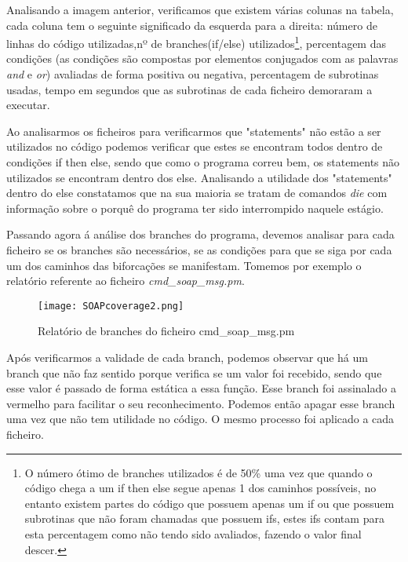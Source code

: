 \par Analisando a imagem anterior, verificamos que existem várias colunas na tabela, cada coluna tem o seguinte significado da esquerda para a direita: número de linhas do código utilizadas,nº de branches(if/else) utilizados\footnote{O número ótimo de branches utilizados é de 50\% uma vez que quando o código chega a um if then else segue apenas 1 dos caminhos possíveis, no entanto existem partes do código que possuem apenas um if ou que possuem subrotinas que não foram chamadas que possuem ifs, estes ifs contam para esta percentagem como não tendo sido avaliados, fazendo o valor final descer.}, percentagem das condições (as condições são compostas por elementos conjugados com as palavras \textit{and} e \textit{or}) avaliadas de forma positiva ou negativa, percentagem de subrotinas usadas, tempo em segundos que as subrotinas de cada ficheiro demoraram a executar.
\par Ao analisarmos os ficheiros para verificarmos que "statements" não estão a ser utilizados no código podemos verificar que estes se encontram todos dentro de condições if then else, sendo que como o programa correu bem, os statements não utilizados se encontram dentro dos else. Analisando a utilidade dos "statements" dentro do else constatamos que na sua maioria se tratam de comandos \textit{die} com informação sobre o porquê do programa ter sido interrompido naquele estágio.


\par Passando agora á análise dos branches do programa, devemos analisar para cada ficheiro se os branches são necessários, se as condições para que se siga por cada um dos caminhos das biforcações se manifestam. Tomemos por exemplo o relatório referente ao ficheiro \textit{cmd\_soap\_msg.pm}.

\begin{figure}[H]

  \centering
  \captionsetup{justification=centering}

  \texttt{[image: SOAPcoverage2.png]}
  
  \caption {Relatório de branches do ficheiro cmd\_soap\_msg.pm}

\end{figure}

\par Após verificarmos a validade de cada branch, podemos observar que há um branch que não faz sentido porque verifica se um valor foi recebido, sendo que esse valor é passado de forma estática a essa função. Esse branch foi assinalado a vermelho para facilitar o seu reconhecimento. Podemos então apagar esse branch uma vez que não tem utilidade no código. O mesmo processo foi aplicado a cada ficheiro.

